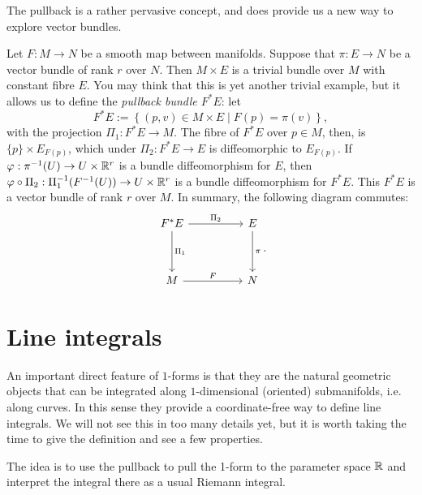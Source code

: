 The pullback is a rather pervasive concept, and does provide us a new way to explore vector bundles.

\begin{example}
  Let $F:M\to N$ be a smooth map between manifolds. Suppose that $\pi: E \to N$ be a vector bundle of rank $r$ over $N$.
  Then $M\times E$ is a trivial bundle over $M$ with constant fibre $E$.
  You may think that this is yet another trivial example, but it allows us to define the \emph{pullback bundle $F^* E$}: let
  \begin{equation}
    F^* E := \left\lbrace (p, v) \in M\times E \mid F(p) = \pi(v)\right\rbrace,
  \end{equation}
  with the projection $\Pi_1:F^* E \to M$.
  The fibre of $F^*E$ over $p\in M$, then, is $\{p\}\times E_{F(p)}$, which under $\Pi_2:F^* E \to E$ is diffeomorphic to $E_{F(p)}$.
  If $\varphi : \pi^{-1}(U) \to U\times\mathbb{R}^r$ is a bundle diffeomorphism for $E$, then $\varphi\circ\Pi_2: \Pi_1^{-1}(F^{-1}(U)) \to U\times\mathbb{R}^r$ is a bundle diffeomorphism for $F^*E$.
  This $F^*E$ is a vector bundle of rank $r$ over $M$. 
  In summary, the following diagram commutes:
  \begin{equation}
    \begin{tikzcd}[row sep=huge, column sep=huge]
      F^* E \arrow[r, "\Pi_2"] \arrow[d, "\Pi_1"]
      & E \arrow[d, "\pi"] \\
      M \arrow[r, "F"]
      & N
    \end{tikzcd}.
  \end{equation}
\end{example}

\section{Line integrals}

An important direct feature of $1$-forms is that they are the natural geometric objects that can be integrated along $1$-dimensional (oriented) submanifolds, i.e. along curves.
In this sense they provide a coordinate-free way to define line integrals.
We will not see this in too many details yet, but it is worth taking the time to give the definition and see a few properties.

The idea is to use the pullback to pull the 1-form to the parameter space $\mathbb{R}$ and interpret the integral there as a usual Riemann integral.

